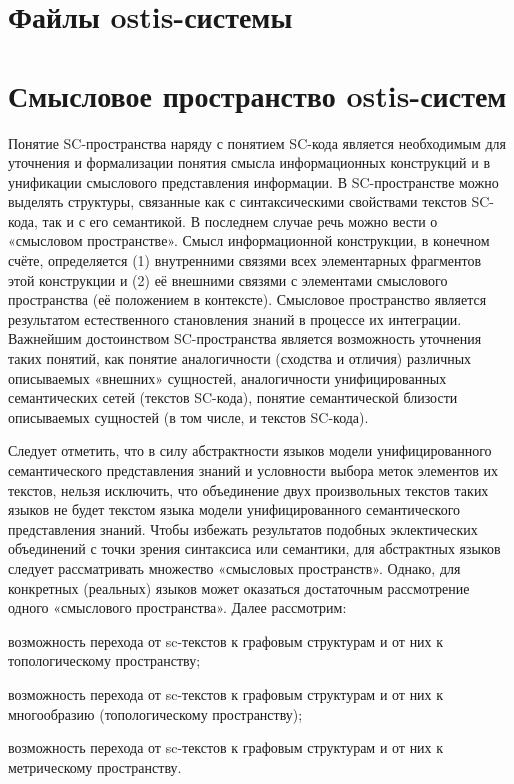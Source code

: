 \section{Файлы ostis-системы}
\label{sec_sr_ostisfiles}
\section{Смысловое пространство ostis-систем}
\label{sec_sr_semspace}
Понятие SC-пространства наряду с понятием SC-кода является необходимым для уточнения и формализации понятия смысла информационных конструкций и в унификации смыслового представления информации. В SC-пространстве можно выделять структуры, связанные как с синтаксическими свойствами текстов SC-кода, так и с его семантикой. В последнем случае речь можно вести о «смысловом пространстве». Смысл информационной конструкции, в конечном счёте, определяется (1) внутренними связями всех элементарных фрагментов этой конструкции и (2) её внешними связями с элементами смыслового пространства (её положением в контексте). Смысловое пространство является результатом естественного становления знаний в процессе их интеграции.
Важнейшим достоинством SC-пространства является возможность уточнения таких понятий, как понятие аналогичности (сходства и отличия) различных описываемых «внешних» сущностей, аналогичности унифицированных семантических сетей (текстов SC-кода), понятие семантической близости описываемых сущностей (в том числе, и текстов SC-кода).

Следует отметить, что в силу абстрактности языков модели унифицированного семантического представления знаний и условности выбора меток элементов их текстов, нельзя исключить, что объединение двух произвольных текстов таких языков не будет текстом языка модели унифицированного семантического представления знаний. Чтобы избежать результатов подобных эклектических объединений с точки зрения синтаксиса или семантики, для абстрактных языков следует рассматривать множество «смысловых пространств». Однако, для конкретных (реальных) языков может оказаться достаточным рассмотрение одного «смыслового пространства».
Далее рассмотрим:

\begin{textitemize}
	\item возможность перехода от sc-текстов к графовым структурам и от них к топологическому пространству;
	\item возможность перехода от sc-текстов к графовым структурам и от них к многообразию (топологическому пространству);
	\item возможность перехода от sc-текстов к графовым структурам и от них к метрическому пространству.
\end{textitemize}

